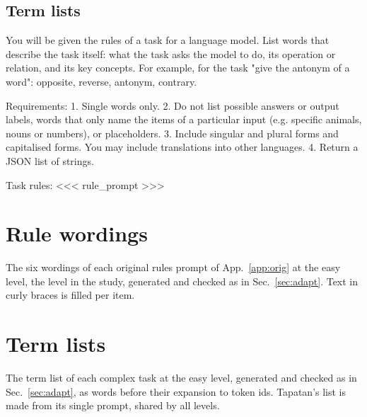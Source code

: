 \subsection*{Term lists}
\begin{promptbox}
You will be given the rules of a task for a language model. List words that describe the task itself: what the task asks the model to do, its operation or relation, and its key concepts. For example, for the task "give the antonym of a word": opposite, reverse, antonym, contrary.

Requirements:
1. Single words only.
2. Do not list possible answers or output labels, words that only name the items of a particular input (e.g. specific animals, nouns or numbers), or placeholders.
3. Include singular and plural forms and capitalised forms. You may include translations into other languages.
4. Return a JSON list of strings.

Task rules:
<<<
{rule_prompt}
>>>
\end{promptbox}

\section{Rule wordings}\label{app:wordings}
The six wordings of each original rules prompt of App.~\ref{app:orig} at the easy level, the level in the study, generated and checked as in Sec.~\ref{sec:adapt}. Text in curly braces is filled per item.



\section{Term lists}\label{app:terms}
The term list of each complex task at the easy level, generated and checked as in Sec.~\ref{sec:adapt}, as words before their expansion to token ids. Tapatan's list is made from its single prompt, shared by all levels.

\begin{center}

\end{center}
